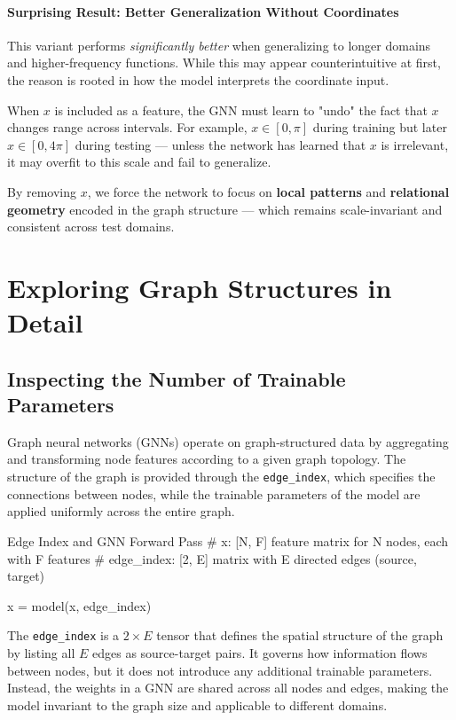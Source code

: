 \paragraph{Surprising Result: Better Generalization Without Coordinates}

This variant performs {\em significantly better} when generalizing to longer domains and higher-frequency functions. While this may appear counterintuitive at first, the reason is rooted in how the model interprets the coordinate input.

When $x$ is included as a feature, the GNN must learn to "undo" the fact that $x$ changes range across intervals. For example, $x \in [0,\pi]$ during training but later $x \in [0,4\pi]$ during testing — unless the network has learned that $x$ is irrelevant, it may overfit to this scale and fail to generalize.

By removing $x$, we force the network to focus on {\bf local patterns} and {\bf relational geometry} encoded in the graph structure — which remains scale-invariant and consistent across test domains.

%
\section{Exploring Graph Structures in Detail}

\subsection{Inspecting the Number of Trainable Parameters}

Graph neural networks (GNNs) operate on graph-structured data by aggregating and transforming node features according to a given graph topology. The structure of the graph is provided through the {\tt edge\_index}, which specifies the connections between nodes, while the trainable parameters of the model are applied uniformly across the entire graph.

\begin{codeonly}{Edge Index and GNN Forward Pass}
# x: [N, F] feature matrix for N nodes, each with F features
# edge_index: [2, E] matrix with E directed edges (source, target)

x = model(x, edge_index)
\end{codeonly}

The {\tt edge\_index} is a $2 \times E$ tensor that defines the spatial structure of the graph by listing all $E$ edges as source-target pairs. It governs how information flows between nodes, but it does not introduce any additional trainable parameters. Instead, the weights in a GNN are shared across all nodes and edges, making the model invariant to the graph size and applicable to different domains.


